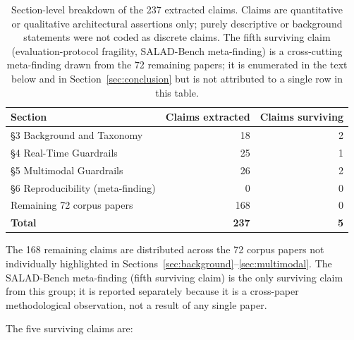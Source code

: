 \begin{table}[h]
  \caption{Section-level breakdown of the 237 extracted claims.
           Claims are quantitative or qualitative architectural assertions only;
           purely descriptive or background statements were not coded as discrete claims.
           The fifth surviving claim (evaluation-protocol fragility, SALAD-Bench
           meta-finding) is a cross-cutting meta-finding drawn from the 72 remaining
           papers; it is enumerated in the text below and in Section~\ref{sec:conclusion}
           but is not attributed to a single row in this table.}
  \label{tab:claim_counts}
  \centering
  \begin{tabular}{lrr}
    \toprule
    \textbf{Section} & \textbf{Claims extracted} & \textbf{Claims surviving} \\
    \midrule
    \S3 Background and Taxonomy         & 18  & 2 \\
    \S4 Real-Time Guardrails            & 25  & 1 \\
    \S5 Multimodal Guardrails           & 26  & 2 \\
    \S6 Reproducibility (meta-finding)  &  0  & 0 \\
    Remaining 72 corpus papers          & 168 & 0 \\
    \midrule
    \textbf{Total}                      & \textbf{237} & \textbf{5} \\
    \bottomrule
  \end{tabular}
  \par\smallskip
  \noindent\small The 168 remaining claims are distributed across the 72 corpus
  papers not individually highlighted in Sections~\ref{sec:background}--\ref{sec:multimodal}.
  The SALAD-Bench meta-finding (fifth surviving claim) is the only surviving claim
  from this group; it is reported separately because it is a cross-paper methodological
  observation, not a result of any single paper.
\end{table}

The five surviving claims are:

